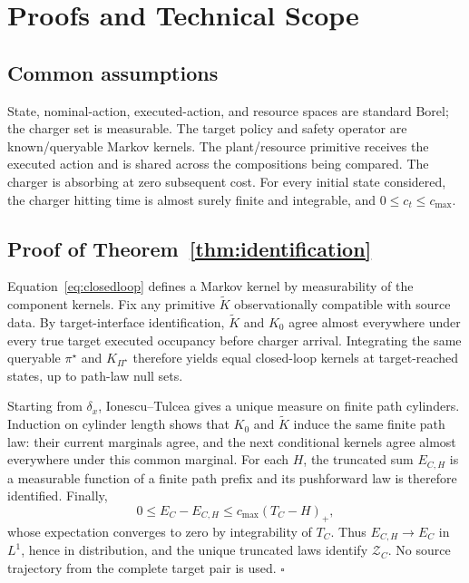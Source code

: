 \section{Proofs and Technical Scope}
\label{app:proofs}

\subsection{Common assumptions}

State, nominal-action, executed-action, and resource spaces are standard Borel; the charger set is measurable. The target policy and safety operator are known/queryable Markov kernels. The plant/resource primitive receives the executed action and is shared across the compositions being compared. The charger is absorbing at zero subsequent cost. For every initial state considered, the charger hitting time is almost surely finite and integrable, and \(0\leq c_t\leq c_{\max}\).

\subsection{Proof of Theorem~\ref{thm:identification}}

Equation~\eqref{eq:closedloop} defines a Markov kernel by measurability of the component kernels. Fix any primitive \(\widetilde K\) observationally compatible with source data. By target-interface identification, \(\widetilde K\) and \(K_0\) agree almost everywhere under every true target executed occupancy before charger arrival. Integrating the same queryable \(\pi^\star\) and \(K_{\Pi^\star}\) therefore yields equal closed-loop kernels at target-reached states, up to path-law null sets.

Starting from \(\delta_x\), Ionescu--Tulcea gives a unique measure on finite path cylinders. Induction on cylinder length shows that \(K_0\) and \(\widetilde K\) induce the same finite path law: their current marginals agree, and the next conditional kernels agree almost everywhere under this common marginal. For each \(H\), the truncated sum \(E_{C,H}\) is a measurable function of a finite path prefix and its pushforward law is therefore identified. Finally,
\[
0\leq E_C-E_{C,H}\leq c_{\max}(T_C-H)_+,
\]
whose expectation converges to zero by integrability of \(T_C\). Thus \(E_{C,H}\to E_C\) in \(L^1\), hence in distribution, and the unique truncated laws identify \(\mathcal Z_C\). No source trajectory from the complete target pair is used. \(\square\)


